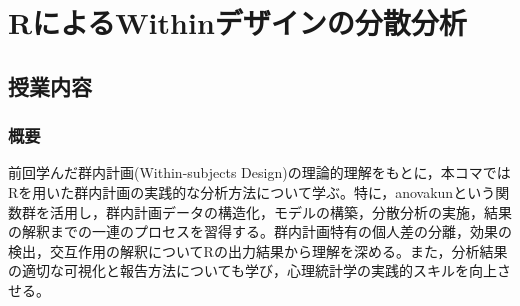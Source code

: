 \section{RによるWithinデザインの分散分析}
\label{b22_WithinDesign_onR} 
\subsection{授業内容}
\subsubsection{概要}
前回学んだ群内計画(Within-subjects Design)の理論的理解をもとに，本コマではRを用いた群内計画の実践的な分析方法について学ぶ。特に，anovakunという関数群を活用し，群内計画データの構造化，モデルの構築，分散分析の実施，結果の解釈までの一連のプロセスを習得する。群内計画特有の個人差の分離，効果の検出，交互作用の解釈についてRの出力結果から理解を深める。また，分析結果の適切な可視化と報告方法についても学び，心理統計学の実践的スキルを向上させる。

